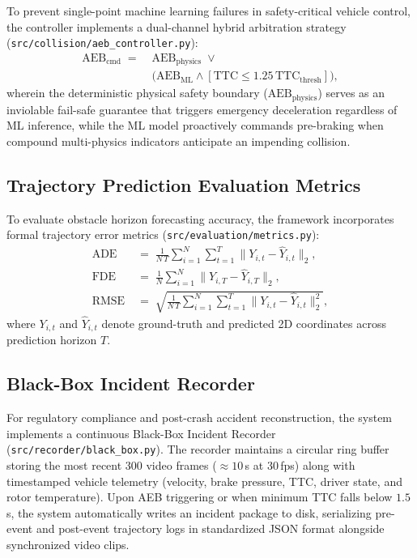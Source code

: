 \documentclass[3p,twocolumn]{elsarticle}
\begin{document}
To prevent single-point machine learning failures in safety-critical vehicle control, the controller implements a dual-channel hybrid arbitration strategy (\texttt{src/collision/aeb\_controller.py}):
\begin{align}
  \text{AEB}_{\text{cmd}} \;=\; &\text{AEB}_{\text{physics}} \;\lor \nonumber \\
  &\Big( \text{AEB}_{\text{ML}} \land [\text{TTC} \le 1.25\,\text{TTC}_{\text{thresh}}] \Big),
  \label{eq:hybrid_arbitration}
\end{align}
wherein the deterministic physical safety boundary ($\text{AEB}_{\text{physics}}$) serves as an inviolable fail-safe guarantee that triggers emergency deceleration regardless of ML inference, while the ML model proactively commands pre-braking when compound multi-physics indicators anticipate an impending collision.

\subsection{Trajectory Prediction Evaluation Metrics}
To evaluate obstacle horizon forecasting accuracy, the framework incorporates formal trajectory error metrics (\texttt{src/evaluation/metrics.py}):
\begin{align}
  \text{ADE} &\;=\; \frac{1}{N\,T} \sum_{i=1}^N \sum_{t=1}^T \|Y_{i,t} - \hat{Y}_{i,t}\|_2, \label{eq:ade} \\
  \text{FDE} &\;=\; \frac{1}{N} \sum_{i=1}^N \|Y_{i,T} - \hat{Y}_{i,T}\|_2, \label{eq:fde} \\
  \text{RMSE} &\;=\; \sqrt{\frac{1}{N\,T} \sum_{i=1}^N \sum_{t=1}^T \|Y_{i,t} - \hat{Y}_{i,t}\|_2^2}, \label{eq:rmse}
\end{align}
where $Y_{i,t}$ and $\hat{Y}_{i,t}$ denote ground-truth and predicted 2D coordinates across prediction horizon $T$.

\subsection{Black-Box Incident Recorder}
For regulatory compliance and post-crash accident reconstruction, the system implements a continuous Black-Box Incident Recorder (\texttt{src/recorder/black\_box.py}). The recorder maintains a circular ring buffer storing the most recent 300 video frames ($\approx 10$\,s at 30\,fps) along with timestamped vehicle telemetry (velocity, brake pressure, TTC, driver state, and rotor temperature). Upon AEB triggering or when minimum TTC falls below $1.5$\,s, the system automatically writes an incident package to disk, serializing pre-event and post-event trajectory logs in standardized JSON format alongside synchronized video clips.
\end{document}
